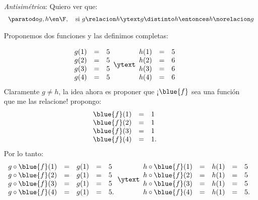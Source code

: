 \begin{enumerate}[label=\roman*)]
\begin{itemize}
                \bigskip

          \item[\textit{Antisimétrica}:] Quiero ver que:
                $$
                  \begin{array}{c}
                    \paratodo g, h \en \F,\quad  \text{si } g \relacion h \ytext g \distinto h \entonces h \norelacion g
                  \end{array}
                $$

                Proponemos dos funciones y las definimos completas:

                $$
                  \begin{array}{rcl}
                    g(1) & = & 5 \\
                    g(2) & = & 5 \\
                    g(3) & = & 5 \\
                    g(4) & = & 5
                  \end{array}
                  \ytext
                  \begin{array}{rcl}
                    h(1) & = & 5 \\
                    h(2) & = & 6 \\
                    h(3) & = & 6 \\
                    h(4) & = & 6
                  \end{array}
                $$
                Claramente $g \neq h$, la idea ahora es proponer que ¡$\blue{f}$ sea una función que me las relacione!
                propongo:
                $$
                  \begin{array}{rcl}
                    \blue{f}(1) & = & 1  \\
                    \blue{f}(2) & = & 1  \\
                    \blue{f}(3) & = & 1  \\
                    \blue{f}(4) & = & 1.
                  \end{array}
                $$
                Por lo tanto:
                $$
                  \begin{array}{rclcl}
                    g \circ \blue{f}(1) & = & g(1) & = & 5  \\
                    g \circ \blue{f}(2) & = & g(1) & = & 5  \\
                    g \circ \blue{f}(3) & = & g(1) & = & 5  \\
                    g \circ \blue{f}(4) & = & g(1) & = & 5.
                  \end{array}
                  \ytext
                  \begin{array}{rclcl}
                    h \circ \blue{f}(1) & = & h(1) & = & 5  \\
                    h \circ \blue{f}(2) & = & h(1) & = & 5  \\
                    h \circ \blue{f}(3) & = & h(1) & = & 5  \\
                    h \circ \blue{f}(4) & = & h(1) & = & 5.
                  \end{array}
                $$


\end{itemize}
\end{enumerate}
